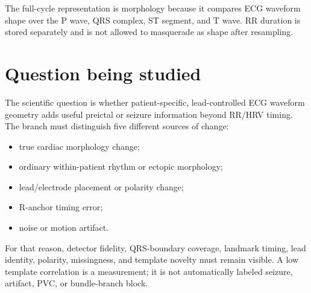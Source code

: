 \documentclass[11pt,a4paper]{article}
\begin{document}
\begin{center}
\end{center}

The full-cycle representation is morphology because it compares ECG waveform shape over the P wave, QRS complex, ST segment, and T wave. RR duration is stored separately and is not allowed to masquerade as shape after resampling.

\section{Question being studied}

The scientific question is whether patient-specific, lead-controlled ECG waveform geometry adds useful preictal or seizure information beyond RR/HRV timing. The branch must distinguish five different sources of change:

\begin{itemize}
  \item true cardiac morphology change;
  \item ordinary within-patient rhythm or ectopic morphology;
  \item lead/electrode placement or polarity change;
  \item R-anchor timing error;
  \item noise or motion artifact.
\end{itemize}

For that reason, detector fidelity, QRS-boundary coverage, landmark timing, lead identity, polarity, missingness, and template novelty must remain visible. A low template correlation is a measurement; it is not automatically labeled seizure, artifact, PVC, or bundle-branch block.
\end{document}
